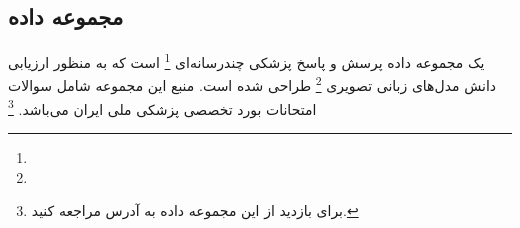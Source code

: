 \subsection{
مجموعه داده
}
یک مجموعه داده پرسش و پاسخ پزشکی چندرسانه‌ای
\footnote{}
است که به منظور ارزیابی دانش مدل‌های زبانی تصویری 
\footnote{}
طراحی شده است.
\cite{b69}
منبع این مجموعه شامل سوالات امتحانات بورد تخصصی پزشکی ملی ایران می‌باشد.
\footnote{
	برای بازدید از این مجموعه داده به آدرس
	مراجعه کنید.
}

